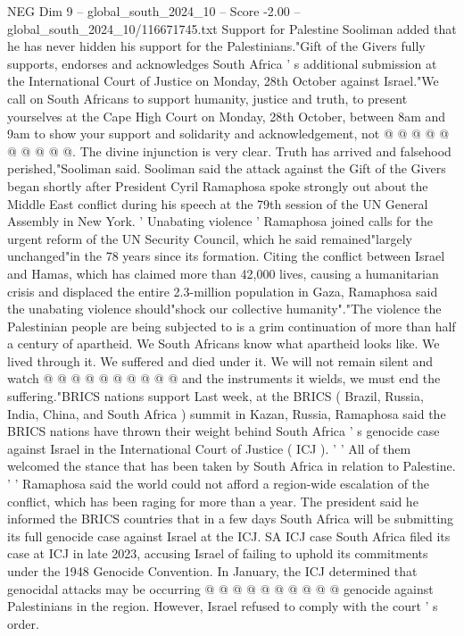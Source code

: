 \begin{textsample}{NEG Dim 9 – global\_south\_2024\_10 – Score -2.00 – global\_south\_2024\_10/116671745.txt}
Support for Palestine Sooliman added that he has never hidden his support for the Palestinians."Gift of the Givers fully supports, endorses and acknowledges South Africa ' s additional submission at the International Court of Justice on Monday, 28th October against Israel."We call on South Africans to support humanity, justice and truth, to present yourselves at the Cape High Court on Monday, 28th October, between 8am and 9am to show your support and solidarity and acknowledgement, not @ @ @ @ @ @ @ @ @ @.
The divine injunction is very clear.
Truth has arrived and falsehood perished,"Sooliman said.
Sooliman said the attack against the Gift of the Givers began shortly after President Cyril Ramaphosa spoke strongly out about the Middle East conflict during his speech at the 79th session of the UN General Assembly in New York. ' Unabating violence ' Ramaphosa joined calls for the urgent reform of the UN Security Council, which he said remained"largely unchanged"in the 78 years since its formation.
Citing the conflict between Israel and Hamas, which has claimed more than 42,000 lives, causing a humanitarian crisis and displaced the entire 2.3-million population in Gaza, Ramaphosa said the unabating violence should"shock our collective humanity"."The violence the Palestinian people are being subjected to is a grim continuation of more than half a century of apartheid.
We South Africans know what apartheid looks like.
We lived through it.
We suffered and died under it.
We will not remain silent and watch @ @ @ @ @ @ @ @ @ @ and the instruments it wields, we must end the suffering."BRICS nations support Last week, at the BRICS ( Brazil, Russia, India, China, and South Africa ) summit in Kazan, Russia, Ramaphosa said the BRICS nations have thrown their weight behind South Africa ' s genocide case against Israel in the International Court of Justice ( ICJ ). ' ' All of them welcomed the stance that has been taken by South Africa in relation to Palestine. ' ' Ramaphosa said the world could not afford a region-wide escalation of the conflict, which has been raging for more than a year.
The president said he informed the BRICS countries that in a few days South Africa will be submitting its full genocide case against Israel at the ICJ.
SA ICJ case South Africa filed its case at ICJ in late 2023, accusing Israel of failing to uphold its commitments under the 1948 Genocide Convention.
In January, the ICJ determined that genocidal attacks may be occurring @ @ @ @ @ @ @ @ @ @ genocide against Palestinians in the region.
However, Israel refused to comply with the court ' s order.

\end{textsample}
